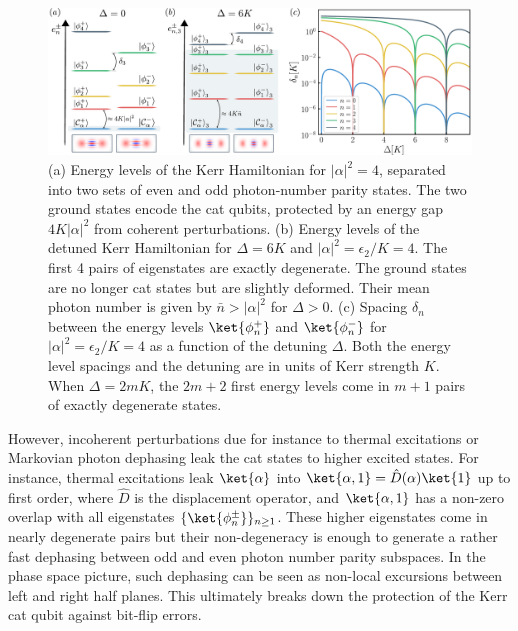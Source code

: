 \begin{figure}[t!]
    \centering
    \includegraphics[width=\textwidth]{file/image/Spectre_V3.pdf}
    \vspace{-0.5cm}
    \caption{\label{fig:arche}
    (a) Energy levels of the Kerr Hamiltonian for $|\alpha|^2=4$, separated into two sets of even and odd photon-number parity states. The two ground states encode the cat qubits, protected by an energy gap $4 K |\alpha|^2$ from coherent perturbations. (b) Energy levels of the detuned Kerr Hamiltonian for $\Delta = 6K$ and $|\alpha|^2=\epsilon_2/K=4$. The first 4 pairs of eigenstates are exactly degenerate. The ground states are no longer cat states but are slightly deformed. Their mean photon number is given by $\bar n>|\alpha|^2$ for $\Delta>0$. (c) Spacing $\delta_n$ between the energy levels $\ket{\phi_n^+}$ and $\ket{\phi_n^-}$ for $|\alpha|^2=\epsilon_2/K=4$ as a function of the detuning $\Delta$. Both the energy level spacings and the detuning are in units of Kerr strength $K$. When $\Delta = 2mK$, the $2m+2$ first energy levels come in $m+1$ pairs of exactly degenerate states.
    }
\end{figure}

However, incoherent perturbations due for instance to thermal excitations or Markovian photon dephasing leak the cat states to higher excited states. For instance, thermal excitations leak $\ket{\alpha}$ into $\ket{\alpha,1} = \hat{D}(\alpha) \ket{1}$ up to first order, where $\hat{D}$ is the displacement operator, and $\ket{\alpha,1}$ has a non-zero overlap with all eigenstates $\{\ket{\phi_n^\pm}\}_{n \ge 1}$. These higher eigenstates come in nearly degenerate pairs but their non-degeneracy is enough to generate a rather fast dephasing between odd and even photon number parity subspaces. In the phase space picture, such dephasing can be seen as non-local excursions between left and right half planes. This ultimately breaks down the protection of the Kerr cat qubit against bit-flip errors.

